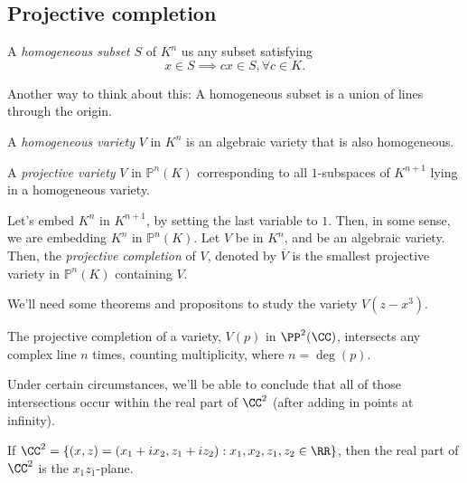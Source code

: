 
\subsection{Projective completion}

\begin{defn}
	A \emph{homogeneous subset} $S$ of $K^n$ us any subset satisfying  \[
		x \in S \implies cx \in S, \forall c \in K.
	\]

	Another way to think about this: A homogeneous subset is a union of lines through the origin.
\end{defn}

\begin{defn}
	A \emph{homogeneous variety} $V$ in $K^n$ is an algebraic variety that is also homogeneous.
\end{defn}

\begin{defn}
	A \emph{projective variety} $V$ in $ \mathbb{P}^n(K)$ corresponding to all $1$-subspaces of $K^{n+1}$ lying in a homogeneous variety.
\end{defn}

\begin{defn}
	Let's embed $K^n$ in $K^{n+1}$, by setting the last variable to $1$. Then, in some sense, we are embedding $K^n$ in $ \mathbb{P}^n(K)$. Let $V$ be in $K^n$, and be an algebraic variety. Then, the \emph{projective completion} of $V$, denoted by $\overline V$ is the smallest projective variety in $ \mathbb{P}^n(K)$ containing $V$.
\end{defn}

We'll need some theorems and propositons to study the variety $V(z - x^3)$.

\begin{thm}[Bézout]
	The projective completion of a variety, $V(p)$ in $\PP^2(\CC)$, intersects any complex line  $n$ times, counting multiplicity, where $n = \deg(p)$.
\end{thm}

\begin{prop} \label{l03.08:prop:intersections}
	Under certain circumstances, we'll be able to conclude that all of those intersections occur within the real part of $\CC^2$ (after adding in points at infinity).

	If $\CC^2 = \{(x, z) = (x_1 + ix_2, z_1 + iz_2) : x_1, x_2, z_1, z_2 \in \RR\}$, then the real part of  $\CC^2$ is the $x_1z_1$-plane.
\end{prop}

